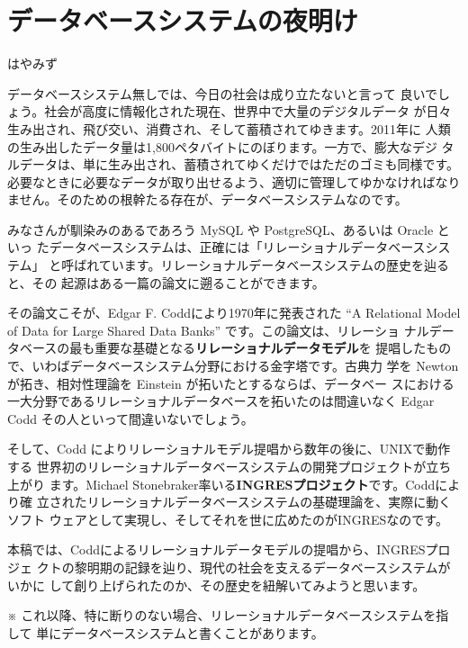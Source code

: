 
\cleardoublepage
\plainifnotempty

\chapter{データベースシステムの夜明け}

\begin{flushright}
はやみず
\end{flushright}

\lettrine{デ}ータベースシステム無しでは、今日の社会は成り立たないと言って
良いでしょう。社会が高度に情報化された現在、世界中で大量のデジタルデータ
が日々生み出され、飛び交い、消費され、そして蓄積されてゆきます。2011年に
人類の生み出したデータ量は1,800ペタバイトにのぼります。一方で、膨大なデジ
タルデータは、単に生み出され、蓄積されてゆくだけではただのゴミも同様です。
必要なときに必要なデータが取り出せるよう、適切に管理してゆかなければなり
ません。そのための根幹たる存在が、データベースシステムなのです。

みなさんが馴染みのあるであろう MySQL や PostgreSQL、あるいは Oracle といっ
たデータベースシステムは、正確には「リレーショナルデータベースシステム」
と呼ばれています。リレーショナルデータベースシステムの歴史を辿ると、その
起源はある一篇の論文に遡ることができます。

その論文こそが、Edgar F.  Coddにより1970年に発表された ``A Relational
Model of Data for Large Shared Data Banks'' です。この論文は、リレーショ
ナルデータベースの最も重要な基礎となる{\bf リレーショナルデータモデル}を
提唱したもので、いわばデータベースシステム分野における金字塔です。古典力
学を Newton が拓き、相対性理論を Einstein が拓いたとするならば、データベー
スにおける一大分野であるリレーショナルデータベースを拓いたのは間違いなく
Edgar Codd その人といって間違いないでしょう。

そして、Codd によりリレーショナルモデル提唱から数年の後に、UNIXで動作する
世界初のリレーショナルデータベースシステムの開発プロジェクトが立ち上がり
ます。Michael Stonebraker率いる{\bf INGRESプロジェクト}です。Coddにより確
立されたリレーショナルデータベースシステムの基礎理論を、実際に動くソフト
ウェアとして実現し、そしてそれを世に広めたのがINGRESなのです。

本稿では、Coddによるリレーショナルデータモデルの提唱から、INGRESプロジェ
クトの黎明期の記録を辿り、現代の社会を支えるデータベースシステムがいかに
して創り上げられたのか、その歴史を紐解いてみようと思います。

{\small ※ これ以降、特に断りのない場合、リレーショナルデータベースシステムを指して
単にデータベースシステムと書くことがあります。}

